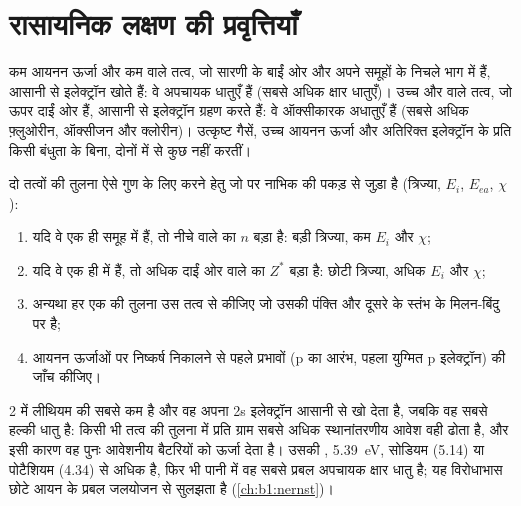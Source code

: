 \section{रासायनिक लक्षण की प्रवृत्तियाँ}

\begin{proposition}[अपचायक और ऑक्सीकारक लक्षण]\label{prop:b1:periodicity:redox-trend}
कम आयनन ऊर्जा और कम  वाले तत्व, जो सारणी के बाईं ओर
और अपने समूहों के निचले भाग में हैं, आसानी से इलेक्ट्रॉन खोते हैं:
वे अपचायक धातुएँ हैं (सबसे अधिक क्षार धातुएँ)। उच्च
 और  वाले तत्व, जो ऊपर दाईं ओर हैं, आसानी से
इलेक्ट्रॉन ग्रहण करते हैं: वे ऑक्सीकारक अधातुएँ हैं (सबसे अधिक फ़्लुओरीन, ऑक्सीजन
और क्लोरीन)। उत्कृष्ट गैसें, उच्च आयनन ऊर्जा और अतिरिक्त
इलेक्ट्रॉन के प्रति किसी बंधुता के बिना, दोनों में से कुछ नहीं करतीं।
\end{proposition}

\begin{method}[स्थिति से प्रवृत्ति का अनुमान]\label{met:b1:periodicity:predict}
दो तत्वों की तुलना ऐसे गुण के लिए करने हेतु जो  पर
नाभिक की पकड़ से जुड़ा है (त्रिज्या, $E_i$, $E_{ea}$, $\chi$):
\begin{enumerate}
  \item यदि वे एक ही समूह में हैं, तो नीचे वाले का
        $n$ बड़ा है: बड़ी त्रिज्या, कम $E_i$ और $\chi$;
  \item यदि वे एक ही  में हैं, तो अधिक दाईं ओर वाले का
        $Z^{*}$ बड़ा है: छोटी त्रिज्या, अधिक $E_i$ और $\chi$;
  \item अन्यथा हर एक की तुलना उस तत्व से कीजिए जो उसकी पंक्ति और दूसरे के
        स्तंभ के मिलन-बिंदु पर है;
  \item आयनन ऊर्जाओं पर निष्कर्ष निकालने से पहले  प्रभावों (p  का
        आरंभ, पहला युग्मित p इलेक्ट्रॉन) की जाँच कीजिए।
\end{enumerate}
\end{method}

\begin{example}[बैटरी में लीथियम]\label{ex:b1:periodicity:lithium}
 2 में लीथियम की  सबसे कम है और वह अपना 2s
इलेक्ट्रॉन आसानी से खो देता है, जबकि वह सबसे हल्की धातु है: किसी भी तत्व की तुलना में
प्रति ग्राम सबसे अधिक स्थानांतरणीय आवेश वही ढोता है, और इसी कारण वह
पुनः आवेशनीय बैटरियों को ऊर्जा देता है। उसकी , \qty{5.39}{eV},
सोडियम (5.14) या पोटैशियम (4.34) से अधिक है, फिर भी पानी में वह
सबसे प्रबल अपचायक क्षार धातु है; यह विरोधाभास छोटे  आयन के प्रबल
जलयोजन से सुलझता है (\cref{ch:b1:nernst})।
\end{example}

